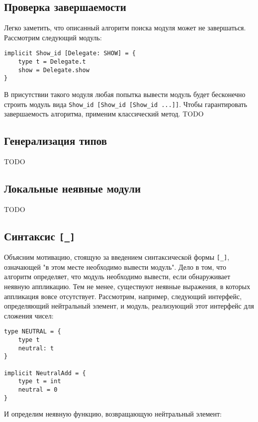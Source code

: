 \documentclass[../diploma.tex]{subfiles}
\begin{document}
\label{sec:2}

\subsection{Проверка завершаемости}

Легко заметить, что описанный алгоритм поиска модуля может не завершаться. Рассмотрим следующий модуль:

\begin{verbatim}
implicit Show_id [Delegate: SHOW] = {
    type t = Delegate.t
    show = Delegate.show
}
\end{verbatim}

В присутствии такого модуля любая попытка вывести модуль будет бесконечно строить модуль вида \texttt{Show\_id [Show\_id [Show\_id ...]]}. Чтобы гарантировать завершаемость алгоритма, применим классический метод. TODO

\subsection{Генерализация типов}

TODO

\subsection{Локальные неявные модули}

TODO

\subsection{Синтаксис \texttt{[\_]}}

Объясним мотивацию, стоящую за введением синтаксической формы \texttt{[\_]}, означающей "в этом месте необходимо вывести модуль". Дело в том, что алгоритм определяет, что модуль необходимо вывести, если обнаруживает неявную аппликацию. Тем не менее, существуют неявные выражения, в которых аппликация вовсе отсутствует. Рассмотрим, например, следующий интерфейс, определяющий нейтральный элемент, и модуль, реализующий этот интерфейс для сложения чисел:

\begin{verbatim}
type NEUTRAL = {
    type t
    neutral: t
}

implicit NeutralAdd = {
    type t = int
    neutral = 0
}
\end{verbatim}

И определим неявную функцию, возвращающую нейтральный элемент:
\end{document}
